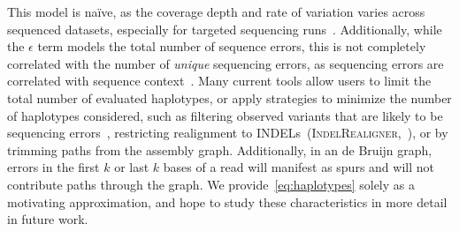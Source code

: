 \documentclass{bioinfo}
\begin{document}
This model is na\"{i}ve, as the coverage depth and rate of variation varies across sequenced datasets,
especially for targeted sequencing runs~\citep{fang14}. Additionally, while the $\epsilon$ term models the
total number of sequence errors, this is not completely correlated with the number of \emph{unique}
sequencing errors, as sequencing errors are correlated with sequence context~\citep{depristo11}. Many
current tools allow users to limit the total number of evaluated haplotypes, or apply strategies to minimize
the number of haplotypes considered, such as filtering observed variants that are likely to be sequencing
errors~\citep{garrison12}, restricting realignment to INDELs~(\textsc{IndelRealigner},~\citep{depristo11}), or
by trimming paths from the assembly graph. Additionally, in an de Bruijn graph, errors in the
first $k$ or last $k$ bases of a read will manifest as spurs and will not contribute paths through the graph. We provide~\eqref{eq:haplotypes} solely as a motivating
approximation, and hope to study these characteristics in more detail in future work.
\end{document}
